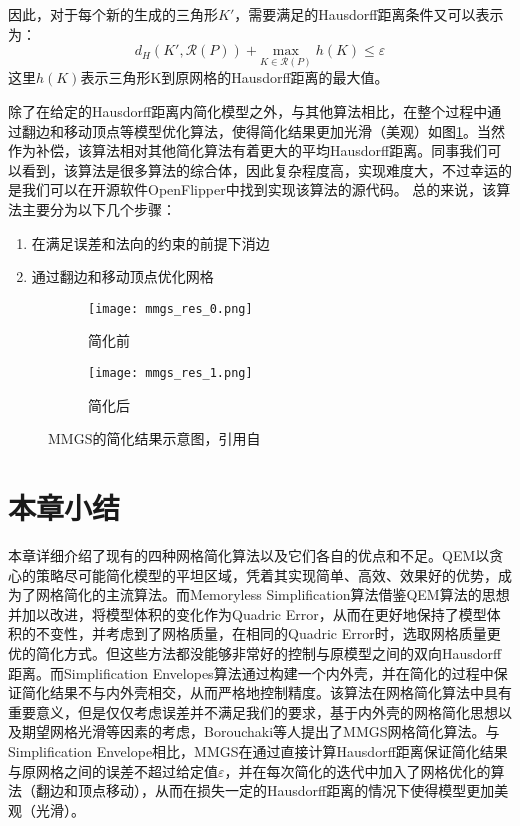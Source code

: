 因此，对于每个新的生成的三角形$K'$，需要满足的Hausdorff距离条件又可以表示为：
\begin{equation}
  d_H(K',\mathcal{R}(P))+\underset{K\in\mathcal{R}(P)}{\text{max}}\;h(K) \le \varepsilon
\end{equation}
这里$h(K)$表示三角形K到原网格的Hausdorff距离的最大值。\par
除了在给定的Hausdorff距离内简化模型之外，与其他算法相比，在整个过程中通过翻边和移动顶点等模型优化算法，使得简化结果更加光滑（美观）如图\ref{fig:mmgs-res}。当然作为补偿，该算法相对其他简化算法有着更大的平均Hausdorff距离。同事我们可以看到，该算法是很多算法的综合体，因此复杂程度高，实现难度大，不过幸运的是我们可以在开源软件OpenFlipper中找到实现该算法的源代码。
总的来说，该算法主要分为以下几个步骤：
\begin{enumerate}[（1）]
  \item 在满足误差和法向的约束的前提下消边
  \item 通过翻边和移动顶点优化网格
\end{enumerate}
\begin{figure}[htbp]
  \centering
  \begin{subfigure}[b]{0.4\textwidth}
    \texttt{[image: mmgs\_res\_0.png]}
    \caption[input]{简化前}
    \end{subfigure}
    \begin{subfigure}[b]{0.4\textwidth}
      \texttt{[image: mmgs\_res\_1.png]}
      \caption[mls]{简化后}
    \end{subfigure}
    \caption[Result]{MMGS的简化结果示意图，引用自\cite{mmgs}}
    \label{fig:mmgs-res}
\end{figure}

\section{本章小结}
本章详细介绍了现有的四种网格简化算法以及它们各自的优点和不足。QEM\cite{qem1}\cite{qem2}以贪心的策略尽可能简化模型的平坦区域，凭着其实现简单、高效、效果好的优势，成为了网格简化的主流算法。而Memoryless Simplification算法\cite{memory-less}借鉴QEM算法的思想并加以改进，将模型体积的变化作为Quadric Error，从而在更好地保持了模型体积的不变性，并考虑到了网格质量，在相同的Quadric Error时，选取网格质量更优的简化方式。但这些方法都没能够非常好的控制与原模型之间的双向Hausdorff距离。而Simplification Envelopes算法\cite{simp-envlop}通过构建一个内外壳，并在简化的过程中保证简化结果不与内外壳相交，从而严格地控制精度。该算法在网格简化算法中具有重要意义，但是仅仅考虑误差并不满足我们的要求，基于内外壳的网格简化思想以及期望网格光滑等因素的考虑，Borouchaki等人提出了MMGS网格简化算法\cite{mmgs}。与Simplification Envelope相比，MMGS在通过直接计算Hausdorff距离保证简化结果与原网格之间的误差不超过给定值$\varepsilon$，并在每次简化的迭代中加入了网格优化的算法（翻边和顶点移动），从而在损失一定的Hausdorff距离的情况下使得模型更加美观（光滑）。
